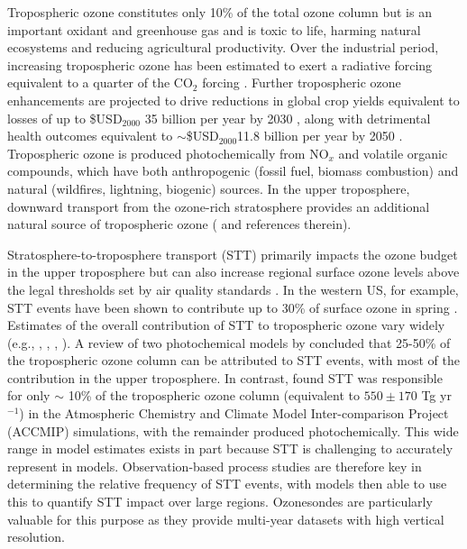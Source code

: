 \documentclass{article}
\begin{document}
    Tropospheric ozone constitutes only 10\% of the total ozone column but is an important oxidant and greenhouse gas and is toxic to life, harming natural ecosystems and reducing agricultural productivity.
    Over the industrial period, increasing tropospheric ozone has been estimated to exert a radiative forcing equivalent to a quarter of the CO$_2$ forcing \citep{IPCC_Chapter2}. 
    Further tropospheric ozone enhancements are projected to drive reductions in global crop yields equivalent to losses of up to \$USD$_{2000}$ 35 billion per year by 2030 \citep{Avnery2011}, along with detrimental health outcomes equivalent to $\sim$\$USD$_{2000}$11.8 billion per year by 2050 \citep{Selin2009}.
    Tropospheric ozone is produced photochemically from NO$_x$ and volatile organic compounds, which have both anthropogenic (fossil fuel, biomass combustion) and natural (wildfires, lightning, biogenic) sources.
    In the upper troposphere, downward transport from the ozone-rich stratosphere provides an additional natural source of tropospheric ozone (\citet{Jacobson2000} and references therein). 
 
    Stratosphere-to-troposphere transport (STT) primarily impacts the ozone budget in the upper troposphere but can also increase regional surface ozone levels above the legal thresholds set by air quality standards \citep{Danielson1968, Lefohn2011, Langford2012, Zhang2014}.
    In the western US, for example, STT events have been shown to contribute up to 30\% of surface ozone in spring \citep{Lin2012}. Estimates of the overall contribution of STT to tropospheric ozone vary widely (e.g., \citep{Galani2003},  \citet{Stohl2003}, \citet{Stevenson2006}, \citet{Lefohn2011}).
    A review of two photochemical models by \citet{Stohl2003} concluded that 25-50\% of the tropospheric ozone column can be attributed to STT events, with most of the contribution in the upper troposphere.
    In contrast, \citet{Stevenson2006} found STT was responsible for only $\sim$ 10\% of the tropospheric ozone column (equivalent to $550\pm170$ Tg yr$^{-1}$) in the Atmospheric Chemistry and Climate Model Inter-comparison Project (ACCMIP) simulations, with the remainder produced photochemically.
    This wide range in model estimates exists in part because STT is challenging to accurately represent in models.
    Observation-based process studies are therefore key in determining the relative frequency of STT events, with models then able to use this to quantify STT impact over large regions.
    Ozonesondes are particularly valuable for this purpose as they provide multi-year datasets with high vertical resolution.
    
\end{document}
